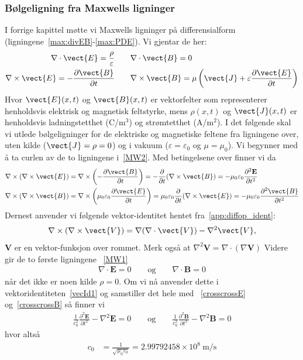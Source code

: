 \subsubsection{Bølgeligning fra Maxwells ligninger}
I forrige kapittel møtte vi Maxwells ligninger på differensialform (ligningene~\eqref{max:divEB}-\eqref{max:PDE}). Vi gjentar de her: 
\begin{align}
\nabla \cdot \vect{E} = \frac{\rho}{\varepsilon}  &\qquad \nabla \cdot \vect{B} = 0 \label{MW1}\\
\nabla \times \vect{E} = -\frac{\partial \vect{B}}{\partial t} & \qquad \nabla \times \vect{B} = \mu \left( \vect{J} + \varepsilon \frac{\partial \vect{E}}{\partial t} \right)\label{MW2}
\end{align}
Hvor \( \vect{E}(x, t) \) og \( \vect{B}(x, t) \) er vektorfelter som representerer henholdsvis elektrisk og magnetisk feltstyrke, mens \( \rho(x, t) \) og \( \vect{J}(x, t) \) er henholdsvis ladningstetthet (C/m$^3$) og strømtetthet (A/m$^2$). 
I det følgende skal vi utlede bølgeligninger for de elektriske og magnetiske feltene fra ligningene over, uten kilde ($\vect{J}=\rho=0$) og i vakuum ($\varepsilon=\varepsilon_0$ og $\mu=\mu_0$). Vi begynner med å ta curlen av de to ligningene i~\eqref{MW2}. Med betingelsene over finner vi da 
\begin{align}
\label{crosscrossE}
\nabla \times (\nabla \times \vect{E}) 
&= \nabla \times \left( -\frac{\partial \vect{B}}{\partial t} \right) 
= -\frac{\partial}{\partial t} (\nabla \times \vect{B}) 
= -\mu_0 \varepsilon_0 \frac{\partial^2 \mathbf{E}}{\partial t^2} \\
\label{crosscrossB}\nabla \times (\nabla \times \vect{B}) 
&= \nabla \times \left( \mu_0 \varepsilon_0 \frac{\partial \vect{E}}{\partial t} \right) 
= \mu_0 \varepsilon_0 \frac{\partial}{\partial t} (\nabla \times \vect{E}) 
= -\mu_0 \varepsilon_0 \frac{\partial^2 \vect{B}}{\partial t^2}
\end{align}
Dernest anvender vi følgende vektor-identitet hentet fra~\ref{app:diffop_ident}:
\begin{align}
\label{vecId1}
\nabla \times (\nabla \times \vect{V}) = \nabla (\nabla \cdot \vect{V}) - \nabla^2 \vect{V},
\end{align}
$\mathbf{V}$ er en vektor-funksjon over rommet. Merk også at 
$\nabla^2 \mathbf{V} = \nabla \cdot (\nabla \mathbf{V})$
Videre gir de to første ligningene ~\eqref{MW1}
\begin{align}
\nabla \cdot \mathbf{E} = 0\quad\quad\textrm{og}\quad\quad
\nabla \cdot \mathbf{B} = 0
\end{align}
når det ikke er noen kilde $\rho=0$.
Om vi nå anvender dette i vektoridentiteten~\eqref{vecId1} og samstiller det hele med ~\eqref{crosscrossE} og~\eqref{crosscrossB} så finner vi
\begin{align*}
\frac{1}{c_0^2} \frac{\partial^2 \mathbf{E}}{\partial t^2} - \nabla^2 \mathbf{E}= 0\quad\quad\textrm{og}\quad\quad
\frac{1}{c_0^2} \frac{\partial^2 \mathbf{B}}{\partial t^2} - \nabla^2 \mathbf{B}= 0
\end{align*}
hvor altså 
\begin{align*}
c_0 &= \frac{1}{\sqrt{\mu_0 \varepsilon_0}} = 2.99792458 \times 10^8 \ \text{m/s}
\end{align*}


